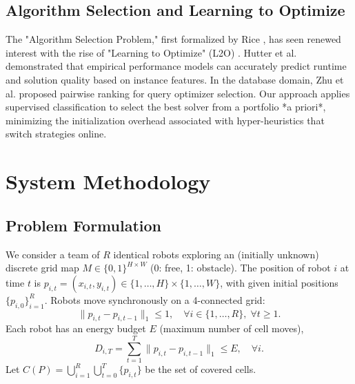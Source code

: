 \documentclass[conference]{IEEEtran}
\begin{document}
\subsection{Algorithm Selection and Learning to Optimize}
The "Algorithm Selection Problem," first formalized by Rice \cite{rice1976algorithm}, has seen renewed interest with the rise of "Learning to Optimize" (L2O) \cite{chen2022learning}. Hutter et al. \cite{hutter2014algorithm} demonstrated that empirical performance models can accurately predict runtime and solution quality based on instance features. In the database domain, Zhu et al. \cite{zhu2023lero} proposed pairwise ranking for query optimizer selection. Our approach applies supervised classification to select the best solver from a portfolio *a priori*, minimizing the initialization overhead associated with hyper-heuristics that switch strategies online.

\section{System Methodology}
\label{sec:methodology}

\subsection{Problem Formulation}
We consider a team of $R$ identical robots exploring an (initially unknown) discrete grid map
$M \in \{0,1\}^{H\times W}$ (0: free, 1: obstacle). The position of robot $i$ at time $t$ is
$p_{i,t}=(x_{i,t},y_{i,t})\in\{1,\ldots,H\}\times\{1,\ldots,W\}$, with given initial positions
$\{p_{i,0}\}_{i=1}^R$. Robots move synchronously on a 4-connected grid:
\begin{equation}
    \lVert p_{i,t}-p_{i,t-1}\rVert_1 \le 1,\quad \forall i\in\{1,\ldots,R\},\; \forall t\ge 1 .
\end{equation}
Each robot has an energy budget $E$ (maximum number of cell moves),
\begin{equation}
    D_{i,T}=\sum_{t=1}^{T}\lVert p_{i,t}-p_{i,t-1}\rVert_1 \le E,\quad \forall i .
\end{equation}
Let $C(P)=\bigcup_{i=1}^{R}\bigcup_{t=0}^{T}\{p_{i,t}\}$ be the set of covered cells.
\end{document}
